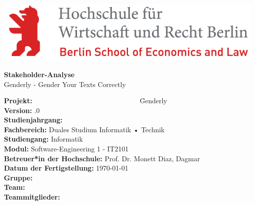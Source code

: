 \hfill
\includegraphics[scale=1]
{Bilder/Logos/HWR_Logo_farbig.jpg}

\begin{center}
	\vspace{1cm}
	\Huge{\textbf{Stakeholder-Analyse}}\\
	\vspace{1cm}
	\Large{Genderly - Gender Your Texts Correctly}\\
	\vspace{1cm}
\end{center}{\huge \par}

\begin{doublespacing}
	\begin{large}
		\begin{tabbing}
			
			\textbf{Projekt:} ~~~~~~~~~~~~~~~~~~~~~~~~~~~~~~ \= Genderly \\
			\textbf{Version:} .0 \\
			\textbf{Studienjahrgang:} \\
			\textbf{Fachbereich:} \> Duales Studium Informatik • Technik \\
			\textbf{Studiengang:} \> Informatik \\
			\textbf{Modul:}	 \> Software-Engineering 1 - IT2101\\
			\textbf{Betreuer*in der Hochschule:} \> Prof. Dr. Monett Diaz, Dagmar \\
			\textbf{Datum der Fertigstellung:} \> \today \\
			\textbf{Gruppe:} \\
			\textbf{Team:} \\
			\textbf{Teammitglieder:} \>  \\
			
		\end{tabbing}
	\end{large}
\end{doublespacing}


\vspace{-1cm}

